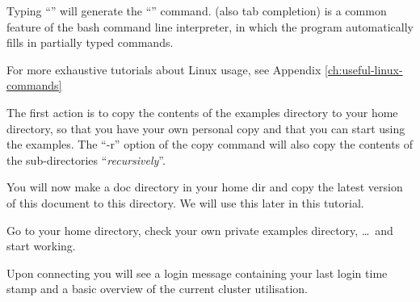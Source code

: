 \begin{prompt}
\end{prompt}

\begin{tip}
Typing ``'' will generate the
``'' command. (also tab completion) is a common feature of the bash command line
interpreter, in which the program automatically fills in partially typed
commands.
\end{tip}

\begin{tip}
For more exhaustive tutorials about Linux usage, see Appendix \ref{ch:useful-linux-commands}
\end{tip}

The first action is to copy the contents of the \hpc examples directory
to your home directory, so that you have your own personal copy and that
you can start using the examples. The ``-r'' option of the copy command
will also copy the contents of the sub-directories ``\emph{recursively}''.

\begin{prompt}
\end{prompt}

\ifgent
You will now make a doc directory in your home dir and copy the latest version of this document to this directory. We will use this later in this tutorial.

\begin{prompt}
\end{prompt}

Go to your home directory, check your own private examples directory, \dots\
and start working.

\begin{prompt}
\end{prompt}

Upon connecting you will see a login message containing your last login
time stamp and a basic overview of the current cluster utilisation.

